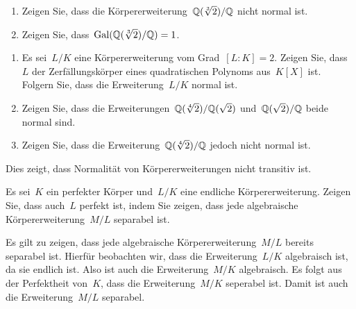 \documentclass{scrartcl}
\begin{document}
\begin{exercise}[subtitle = {Erstklausur~18/19}]
  \begin{enumerate}
    \item
      Zeigen Sie, dass die Körpererweiterung~$\mathbb{Q}(\sqrt[3]{2}) / \mathbb{Q}$ nicht normal ist.
    \item
      Zeigen Sie, dass~$\operatorname{Gal}( \mathbb{Q}(\sqrt[3]{2}) / \mathbb{Q} ) = 1$.
  \end{enumerate}
\end{exercise}

\begin{exercise}
  \begin{enumerate}
    \item
      Es sei~$L/K$ eine Körpererweiterung vom Grad~$[L : K] = 2$.
      Zeigen Sie, dass~$L$ der Zerfällungskörper eines quadratischen Polynoms aus~$K[X]$ ist.
      Folgern Sie, dass die Erweiterung~$L/K$ normal ist.
    \item
      Zeigen Sie, dass die Erweiterungen~$\mathbb{Q}(\sqrt[4]{2}) / \mathbb{Q}(\sqrt{2})$ und~$\mathbb{Q}(\sqrt{2}) / \mathbb{Q}$ beide normal sind.
    \item
      Zeigen Sie, dass die Erweiterung~$\mathbb{Q}(\sqrt[4]{2}) / \mathbb{Q}$ jedoch nicht normal ist.
  \end{enumerate}
  Dies zeigt, dass Normalität von Körpererweiterungen nicht transitiv ist.
\end{exercise}

\begin{exercise}
  Es sei~$K$ ein perfekter Körper und~$L/K$ eine endliche Körpererweiterung.
  Zeigen Sie, dass auch~$L$ perfekt ist, indem Sie zeigen, dass jede algebraische Körpererweiterung~$M/L$ separabel ist.
\end{exercise}

\begin{solution}
  Es gilt zu zeigen, dass jede algebraische Körpererweiterung~$M/L$ bereits separabel ist.
  Hierfür beobachten wir, dass die Erweiterung~$L/K$ algebraisch ist, da sie endlich ist.
  Also ist auch die Erweiterung~$M/K$ algebraisch.
  Es folgt aus der Perfektheit von~$K$, dass die Erweiterung~$M/K$ seperabel ist.
  Damit ist auch die Erweiterung~$M/L$ separabel.
\end{solution}





\clearpage





\printsolutions
\end{document}
